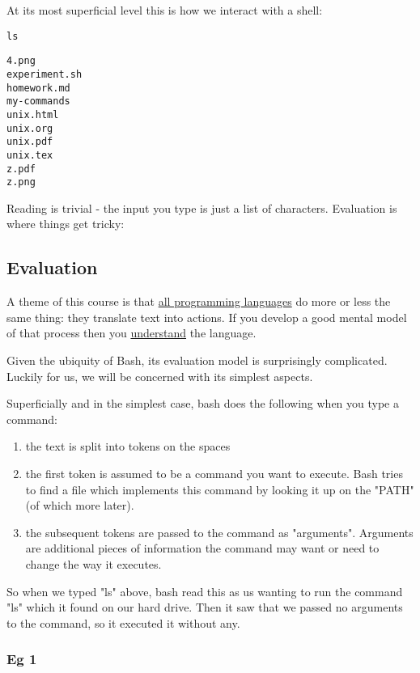 \documentclass[11pt]{article}
\begin{document}
At its most superficial level this is how we interact with a shell:

\begin{verbatim}
ls
\end{verbatim}

\begin{verbatim}
4.png
experiment.sh
homework.md
my-commands
unix.html
unix.org
unix.pdf
unix.tex
z.pdf
z.png
\end{verbatim}

Reading is trivial - the input you type is just a list of
characters. Evaluation is where things get tricky:

\subsection{Evaluation}
\label{sec:org510e2ac}

A theme of this course is that \uline{all programming languages} do more or
less the same thing: they translate text into actions. If you develop
a good mental model of that process then you \uline{understand} the
language.

Given the ubiquity of Bash, its evaluation model is surprisingly
complicated. Luckily for us, we will be concerned with its simplest
aspects.

Superficially and in the simplest case, bash does the following when
you type a command:

\begin{enumerate}
\item the text is split into tokens on the spaces
\item the first token is assumed to be a command you want to
execute. Bash tries to find a file which implements this command by
looking it up on the "PATH" (of which more later).
\item the subsequent tokens are passed to the command as
"arguments". Arguments are additional pieces of information the
command may want or need to change the way it executes.
\end{enumerate}

So when we typed "ls" above, bash read this as us wanting to run the
command "ls" which it found on our hard drive. Then it saw that we
passed no arguments to the command, so it executed it without any.

\subsubsection{Eg 1}
\label{sec:org1134eef}
\end{document}
